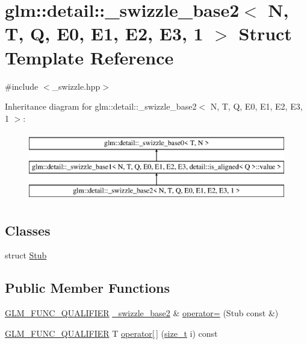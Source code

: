 \hypertarget{structglm_1_1detail_1_1__swizzle__base2_3_01_n_00_01_t_00_01_q_00_01_e0_00_01_e1_00_01_e2_00_01_e3_00_011_01_4}{}\section{glm\+:\+:detail\+:\+:\+\_\+swizzle\+\_\+base2$<$ N, T, Q, E0, E1, E2, E3, 1 $>$ Struct Template Reference}
\label{structglm_1_1detail_1_1__swizzle__base2_3_01_n_00_01_t_00_01_q_00_01_e0_00_01_e1_00_01_e2_00_01_e3_00_011_01_4}


{\ttfamily \#include $<$\+\_\+swizzle.\+hpp$>$}

Inheritance diagram for glm\+:\+:detail\+:\+:\+\_\+swizzle\+\_\+base2$<$ N, T, Q, E0, E1, E2, E3, 1 $>$\+:\begin{figure}[H]
\begin{center}
\leavevmode
\includegraphics[height=3.000000cm]{structglm_1_1detail_1_1__swizzle__base2_3_01_n_00_01_t_00_01_q_00_01_e0_00_01_e1_00_01_e2_00_01_e3_00_011_01_4}
\end{center}
\end{figure}
\subsection*{Classes}
\begin{DoxyCompactItemize}
\item 
struct \mbox{\hyperlink{structglm_1_1detail_1_1__swizzle__base2_3_01_n_00_01_t_00_01_q_00_01_e0_00_01_e1_00_01_e2_00_01_e3_00_011_01_4_1_1_stub}{Stub}}
\end{DoxyCompactItemize}
\subsection*{Public Member Functions}
\begin{DoxyCompactItemize}
\item 
\mbox{\hyperlink{setup_8hpp_a33fdea6f91c5f834105f7415e2a64407}{G\+L\+M\+\_\+\+F\+U\+N\+C\+\_\+\+Q\+U\+A\+L\+I\+F\+I\+ER}} \mbox{\hyperlink{structglm_1_1detail_1_1__swizzle__base2}{\+\_\+swizzle\+\_\+base2}} \& \mbox{\hyperlink{structglm_1_1detail_1_1__swizzle__base2_3_01_n_00_01_t_00_01_q_00_01_e0_00_01_e1_00_01_e2_00_01_e3_00_011_01_4_ac03f20f08c7f9d891981cd889dc226f8}{operator=}} (Stub const \&)
\item 
\mbox{\hyperlink{setup_8hpp_a33fdea6f91c5f834105f7415e2a64407}{G\+L\+M\+\_\+\+F\+U\+N\+C\+\_\+\+Q\+U\+A\+L\+I\+F\+I\+ER}} T \mbox{\hyperlink{structglm_1_1detail_1_1__swizzle__base2_3_01_n_00_01_t_00_01_q_00_01_e0_00_01_e1_00_01_e2_00_01_e3_00_011_01_4_a991d5b0234288e6751481164111e2a92}{operator\mbox{[}$\,$\mbox{]}}} (\mbox{\hyperlink{_s_d_l__config__winrt_8h_a7c94ea6f8948649f8d181ae55911eeaf}{size\+\_\+t}} i) const
\end{DoxyCompactItemize}
